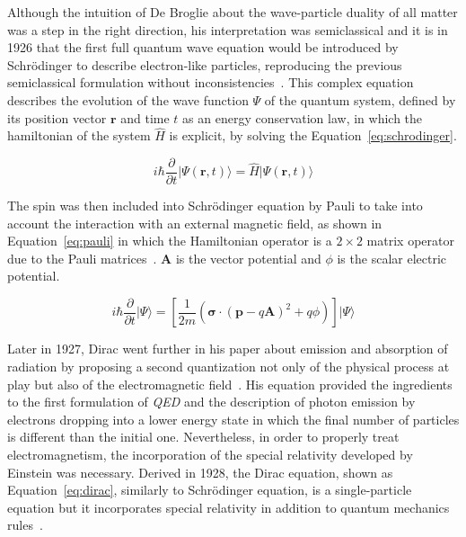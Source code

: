 	Although the intuition of De Broglie about the wave-particle duality of all matter was a step in the right direction, his interpretation was semiclassical and it is in 1926 that the first full quantum wave equation would be introduced by Schrödinger to describe electron-like particles, reproducing the previous semiclassical formulation without inconsistencies~\cite{SCHRODINGER1926}. This complex equation describes the evolution of the wave function $\Psi$ of the quantum system, defined by its position vector $\mathbf{r}$ and time $t$ as an energy conservation law, in which the hamiltonian of the system $\hat{H}$ is explicit, by solving the Equation~\ref{eq:schrodinger}.
	
	\begin{equation}
		\label{eq:schrodinger}
		i\hbar \frac{\partial}{\partial t} \vert \Psi(\mathbf{r},t)\rangle  = \hat{H} \vert \Psi(\mathbf{r},t)\rangle
	\end{equation}
	
	The spin was then included into Schrödinger equation by Pauli to take into account the interaction with an external magnetic field, as shown in Equation~\ref{eq:pauli} in which the Hamiltonian operator is a $2 \times 2$ matrix operator due to the Pauli matrices~\cite{PAULI1927}. $\mathbf{A}$ is the vector potential and $\phi$ is the scalar electric potential.
	
	\begin{equation}
		\label{eq:pauli}
		i\hbar \frac{\partial}{\partial t} \vert\Psi\rangle  =  \left[\frac{1}{2m}(\mathbf{\sigma}\cdot(\mathbf{p}-q\mathbf{A})^2+q\phi)\right]\vert\Psi\rangle
	\end{equation}
	
	Later in 1927, Dirac went further in his paper about emission and absorption of radiation by proposing a second quantization not only of the physical process at play but also of the electromagnetic field~\cite{DIRAC1927}. His equation provided the ingredients to the first formulation of \textit{\acf{QED}} and the description of photon emission by electrons dropping into a lower energy state in which the final number of particles is different than the initial one. Nevertheless, in order to properly treat electromagnetism, the incorporation of the special relativity developed by Einstein was necessary. Derived in 1928, the Dirac equation, shown as Equation~\ref{eq:dirac}, similarly to Schrödinger equation, is a single-particle equation but it incorporates special relativity in addition to quantum mechanics rules~\cite{DIRAC1928}.
	
